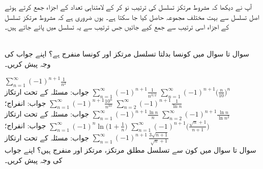 آپ نے دیکھا کہ مشروط مرتکز تسلسل کی ترتیب نو کر کے لامتناہی تعداد کے اجزاء جمع کرتے ہوئے  اصل تسلسل سے بہت مختلف مجموعہ حاصل کیا جا سکتا ہے۔ یوں ضروری ہے کہ مشروط مرتکز تسلسل کے اجزاء اسی ترتیب سے جمع کیے جائیں جس ترتیب سے یہ تسلسل میں پائے جاتے ہیں۔  

\\
سوال  تا سوال  میں کونسا بدلتا تسلسل مرتکز اور کونسا منفرج ہے؟ اپنے جواب کی وجہ پیش کریں۔

$\sum\limits_{n=1}^{\infty}(-1)^{n+1}\frac{1}{n^2}$\\
جواب:\quad
مسئلہ  کے تحت ارتکاز
$\sum\limits_{n=1}^{\infty}(-1)^{n+1}\frac{1}{n^{3/2}}$
$\sum\limits_{n=1}^{\infty}(-1)^{n+1}\big(\frac{n}{10}\big)^n$\\
جواب:\quad
انفراج؛ 
$\sum\limits_{n=1}^{\infty}(-1)^{n+1}\frac{10^n}{n^{10}}$
$\sum\limits_{n=2}^{\infty}(-1)^{n+1}\frac{1}{\ln n}$\\
جواب:\quad
مسئلہ  کے تحت ارتکاز
$\sum\limits_{n=1}^{\infty}(-1)^{n+1}\frac{\ln n}{n}$
$\sum\limits_{n=2}^{\infty}(-1)^{n+1}\frac{\ln n}{\ln n^2}$\\
جواب:\quad
انفراج؛ 
$\sum\limits_{n=1}^{\infty}(-1)^{n}\ln\big(1+\frac{1}{n}\big)$
$\sum\limits_{n=1}^{\infty}(-1)^{n+1}\big(\frac{\sqrt{n}+1}{n+1}\big)$\\
جواب:\quad
مسئلہ  کے تحت ارتکاز
$\sum\limits_{n=1}^{\infty}(-1)^{n+1}\,\frac{3\sqrt{n+1}}{\sqrt{n}+1}$
\\
سوال  تا سوال  میں کون سے تسلسل مطلق مرتکز، مرتکز اور منفرج ہیں؟ اپنے جواب کی وجہ پیش کریں۔
 
